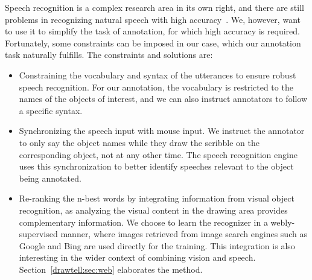 Speech recognition is a complex research area in its own right, and there are still problems  in recognizing natural speech with high accuracy~\citep{SR:review}. We, however, want to use it to simplify 
the task of annotation, for which high accuracy is required. Fortunately, some 
constraints can be imposed in our case, which our annotation task naturally 
fulfills. The constraints and solutions are:
\begin{itemize}
\item Constraining the vocabulary and syntax of the utterances to
  ensure robust speech recognition. For our annotation, the vocabulary
  is restricted to the names  of the objects of interest,
  and we can also instruct annotators to follow a specific syntax.

\item Synchronizing the speech input with mouse input. We instruct the annotator to only say the object names while they draw the scribble on the corresponding object, not at any other time. The speech recognition engine uses this synchronization to better identify speeches relevant to the object being annotated.

\item Re-ranking the n-best words by integrating information from visual object recognition, as analyzing the visual content in the drawing area provides complementary information. We choose to learn the recognizer in a webly-supervised manner, where images retrieved from image search engines such as Google and Bing are used directly for the training. This integration is also interesting in the wider context of combining vision and speech.  Section~\ref{drawtell:sec:web} elaborates the method. 

\end{itemize}

